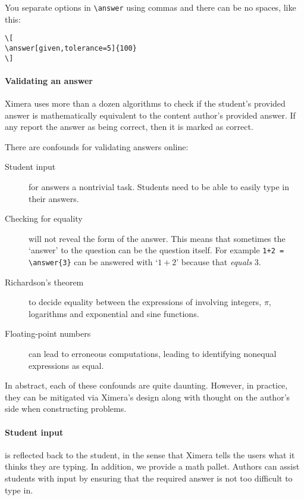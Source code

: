 \documentclass{ximera}
\begin{document}
\begin{warning}
  You separate options in \verb!\answer! using commas and there can be no
  spaces, like this:
  \begin{verbatim}
\[
\answer[given,tolerance=5]{100}
\]
\end{verbatim}
\end{warning}

\paragraph{Validating an answer}

Ximera uses more than a dozen algorithms to check if the student's provided
answer is mathematically equivalent to the content author's provided answer. If
any report the answer as being correct, then it is marked as correct.

There are confounds for validating answers online:
\begin{description}
  \item[Student input] for answers a nontrivial task. Students need to be able
    to easily type in their answers.
  \item[Checking for equality] will not reveal the form of the answer. This
    means that sometimes the `answer' to the question can be the question
    itself. For example  \verb!1+2 = \answer{3}! can be answered with `$1+2$'
    because
    that \textit{equals} $3$.
    \item[Richardson's theorem ]
    to decide equality between the expressions of involving integers, $\pi$,
    logarithms and exponential and sine functions.
  \item[Floating-point numbers] can lead to erroneous computations, leading to
    identifying nonequal expressions as equal.
\end{description}
In abstract, each of these confounds are quite daunting. However, in practice,
they can be mitigated via Ximera's design along with thought on the author's
side when constructing problems.

\paragraph{Student input} is reflected back to the student, in the sense that Ximera tells the users what it thinks they are typing.
In addition, we provide a math
pallet. Authors can assist students with input by ensuring that the required
answer is not too difficult to type in.
\end{document}
